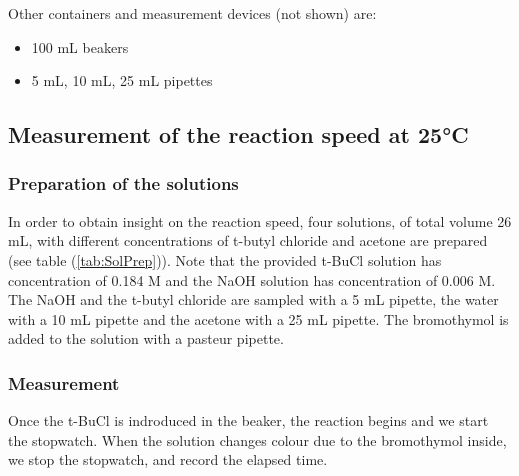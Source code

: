 \documentclass[12pt]{article}
\begin{document}
\clearpage
\noindent Other containers and measurement devices (not shown) are: \begin{itemize}
    \item 100 mL beakers 
    \item 5 mL, 10 mL, 25 mL pipettes
\end{itemize}

\subsection{Measurement of the reaction speed at 25°C}

\subsubsection{Preparation of the solutions}

In order to obtain insight on the reaction speed, four solutions, of total volume 26 mL, with different concentrations of t-butyl chloride and acetone are prepared (see table (\ref{tab:SolPrep})). Note that the provided t-BuCl solution has concentration of 0.184 M and the NaOH solution has concentration of 0.006 M. The NaOH and the t-butyl chloride are sampled with a 5 mL pipette, the water with a 10 mL pipette and the acetone with a 25 mL pipette. The bromothymol is added to the solution with a pasteur pipette.
    
\begin{table}[h!]
    \centering
    \caption{Solution preparation}
    \label{tab:SolPrep}
\end{table}

\subsubsection{Measurement}
Once the t-BuCl is indroduced in the beaker, the reaction begins and we start the stopwatch. When the solution changes colour due to the bromothymol inside, we stop the stopwatch, and record the elapsed time.
\end{document}
